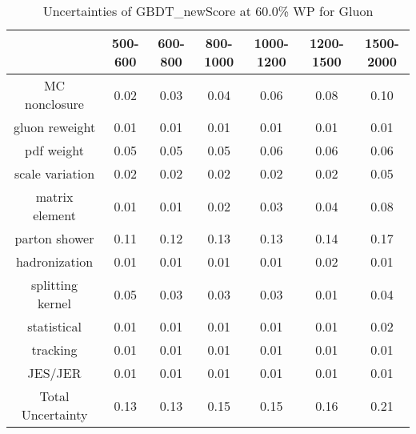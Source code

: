 \begin{table}
\centering
\caption{Uncertainties of GBDT_newScore at 60.0\% WP for Gluon}
\label{tab:syst_GBDT_newScore_0.6_Gluon}
\begin{tabular}{ccccccc}
\toprule
{} &  500-600 &  600-800 &  800-1000 &  1000-1200 &  1200-1500 &  1500-2000 \\
\midrule
MC nonclosure     &     0.02 &     0.03 &      0.04 &       0.06 &       0.08 &       0.10 \\
gluon reweight    &     0.01 &     0.01 &      0.01 &       0.01 &       0.01 &       0.01 \\
pdf weight        &     0.05 &     0.05 &      0.05 &       0.06 &       0.06 &       0.06 \\
scale variation   &     0.02 &     0.02 &      0.02 &       0.02 &       0.02 &       0.05 \\
matrix element    &     0.01 &     0.01 &      0.02 &       0.03 &       0.04 &       0.08 \\
parton shower     &     0.11 &     0.12 &      0.13 &       0.13 &       0.14 &       0.17 \\
hadronization     &     0.01 &     0.01 &      0.01 &       0.01 &       0.02 &       0.01 \\
splitting kernel  &     0.05 &     0.03 &      0.03 &       0.03 &       0.01 &       0.04 \\
statistical       &     0.01 &     0.01 &      0.01 &       0.01 &       0.01 &       0.02 \\
tracking          &     0.01 &     0.01 &      0.01 &       0.01 &       0.01 &       0.01 \\
JES/JER           &     0.01 &     0.01 &      0.01 &       0.01 &       0.01 &       0.01 \\
Total Uncertainty &     0.13 &     0.13 &      0.15 &       0.15 &       0.16 &       0.21 \\
\bottomrule
\end{tabular}
\end{table}
